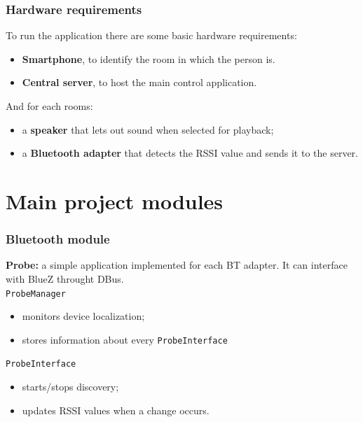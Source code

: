 \documentclass{beamer}
\begin{document}
	\begin{frame}
		\frametitle{Hardware requirements}
		To run the application there are some basic hardware requirements:
		\pause
		\begin{itemize}
		\item \textbf{Smartphone}, to identify the room in which the person is.
		\item \textbf{Central server}, to host the main control application.
		\end{itemize}
		\pause
		And for each rooms:
		\begin{itemize}
		\item a \textbf{speaker} that lets out sound when selected for playback;
		\item a \textbf{Bluetooth adapter} that detects the RSSI value and sends it to the server.
		\end{itemize}
		
		 
		
	\end{frame}
	

\section{Main project modules}

	\begin{frame}
		\frametitle{Bluetooth module}
		\textbf{Probe:} a simple application implemented for each BT adapter. It can interface with BlueZ throught DBus.\\
		\vspace{0.5cm}
		\texttt{ProbeManager}
		\begin{itemize}
		\item monitors device localization;
		\item stores information about every \texttt{ProbeInterface}
		\end{itemize}
		\texttt{ProbeInterface}
		\begin{itemize}
		\item starts/stops discovery;
		\item updates RSSI values when a change occurs.
		\end{itemize}
	
	\end{frame}
	
\end{document}
